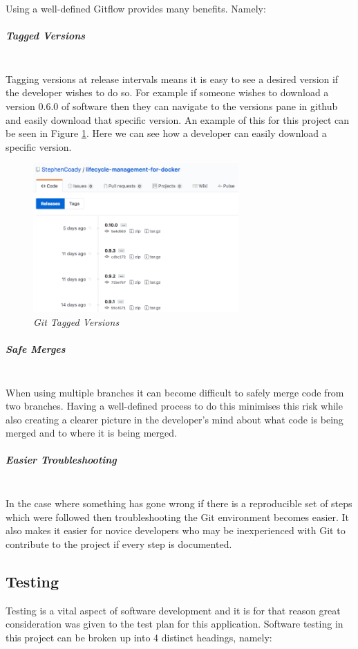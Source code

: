 Using a well-defined Gitflow provides many benefits. Namely:

\subparagraph{Tagged Versions}\mbox{}\\
Tagging versions at release intervals means it is easy to see a desired version if the developer wishes to do so. For example if someone wishes to download a version 0.6.0 of software then they can navigate to the versions pane in \gls{github} and easily download that specific version. An example of this for this project can be seen in Figure \ref{fig:git_tags}. Here we can see how a developer can easily download a specific version.

\begin{figure}[!ht]
\centering
\includegraphics*[width=0.7\textwidth]{images/git_tags}
\caption{\em Git Tagged Versions}
\label{fig:git_tags}
\end{figure}

\subparagraph{Safe Merges}\mbox{}\\
When using multiple branches it can become difficult to safely merge code from two branches. Having a well-defined process to do this minimises this risk while also creating a clearer picture in the developer's mind about what code is being merged and to where it is being merged.

\subparagraph{Easier Troubleshooting}\mbox{}\\
In the case where something has gone wrong if there is a reproducible set of steps which were followed then troubleshooting the Git environment becomes easier. It also makes it easier for novice developers who may be inexperienced with Git to contribute to the project if every step is documented.

\subsection{Testing}
\label{sub:testing}
Testing is a vital aspect of software development and it is for that reason great consideration was given to the test plan for this application. Software testing in this project can be broken up into 4 distinct headings, namely:


